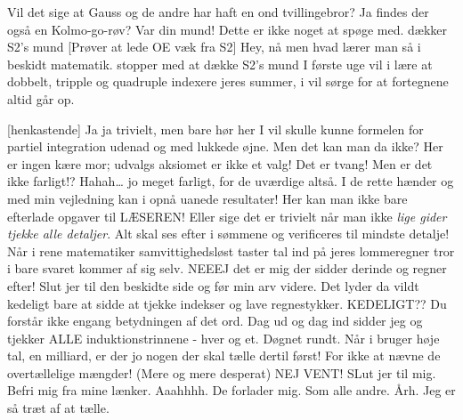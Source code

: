 \documentclass[a4paper,11pt]{article}
\begin{document}
\begin{sketch}
 
 Vil det sige at Gauss og de andre har haft en ond tvillingebror?
 Ja findes der også en Kolmo-go-røv?
 Var din mund! Dette er ikke noget at spøge med. 
 {dækker S2’s mund}
 
[Prøver at lede OE væk fra S2] Hey, nå men hvad lærer man så i beskidt matematik.
 {stopper med at dække S2’s mund}
 I første uge vil i lære at dobbelt, tripple og quadruple indexere jeres summer,  i vil sørge for at fortegnene altid går op.

 
[henkastende] Ja ja trivielt, men bare hør her
 I vil skulle kunne formelen for partiel integration udenad og med lukkede øjne. 
 Men det kan man da ikke?
 Her er ingen kære mor; udvalgs aksiomet er ikke et valg! Det er tvang!
 Men er det ikke farligt!?
 Hahah… jo meget farligt, for de uværdige altså. I de rette hænder og med min vejledning kan i opnå uanede resultater! Her kan man ikke bare efterlade opgaver til LÆSEREN! Eller sige det er trivielt når man ikke \textit{lige gider tjekke alle detaljer}. Alt skal ses efter i sømmene og verificeres til mindste detalje!
 Når i rene matematiker samvittighedsløst taster tal ind på jeres lommeregner tror i bare svaret kommer af sig selv.
 NEEEJ det er mig der sidder derinde og regner efter! Slut jer til den beskidte side og før min arv videre. 
 Det lyder da vildt kedeligt bare at sidde at tjekke indekser og lave regnestykker.
 KEDELIGT?? Du forstår ikke engang betydningen af det ord. Dag ud og dag ind sidder jeg og tjekker ALLE induktionstrinnene - hver og et. Døgnet rundt. Når i bruger høje tal, en milliard, er der jo nogen der skal tælle dertil først! For ikke at nævne de overtællelige mængder! (Mere og mere desperat)
 NEJ VENT! SLut jer til mig. Befri mig fra mine lænker.
 Aaahhhh. De forlader mig. Som alle andre. Årh. Jeg er så træt af at tælle.
\end{sketch}
\end{document}
